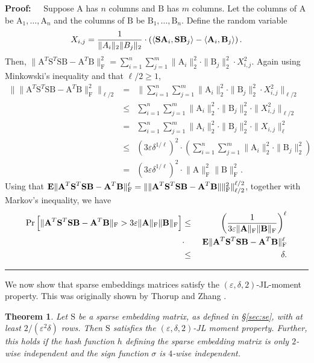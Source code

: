 \documentclass[11pt]{article}
\newcommand{\FNorm }[1]{\mbox{}\|#1\|_\mathrm{F}  }
\newcommand{\FNormS}[1]{\mbox{}\|#1\|_\mathrm{F}^2}
\newtheorem{theorem}{Theorem}
\newenvironment{proof}{\begin{trivlist} \item {\bf Proof:~~}}
  {\qed\end{trivlist}}
\newcommand{\mat}[1]{{\ensuremath{\bm{\mathrm{#1}}}}}
\def\matA{\mat{A}}
\def\matB{\mat{B}}
\def\matS{\mat{S}}
\def\frac#1#2{{#1\over #2}}
\def\qed{\hfill\rule{2mm}{2mm}}
\newcommand{\eps}{\varepsilon}
\begin{document}
\begin{proof}
Suppose $\matA$ has $n$ columns and $\matB$ has $m$ columns. 
Let the columns of $\matA$ be $\matA_1, \ldots, \matA_n$ and the columns of $\matB$ be $\matB_1, \ldots, \matB_n$. 
Define the random variable 
$$X_{i,j} = \frac{1}{\|A_i\|_2 \|B_j\|_2} \cdot \left (\langle \matS \matA_i, \matS \matB_j \rangle
- \langle \matA_i, \matB_j \rangle \right ).$$
Then, $\FNormS{\matA^T \matS^T \matS \matB - \matA^T \matB} = \sum_{i=1}^n \sum_{j=1}^m \|\matA_i\|_2^2 \cdot \|\matB_j\|_2^2 \cdot X_{i,j}^2$. Again using Minkowski's inequality and that $\ell/2 \geq 1$,
\begin{eqnarray*}
\|\FNormS{\matA^T\matS^T \matS \matB - \matA^T\matB}\|_{\ell/2} & = & 
\|\sum_{i=1}^n \sum_{j=1}^m \|\matA_i\|_2^2 \cdot \|\matB_j\|_2^2 \cdot X_{i,j}^2\|_{\ell/2}\\
& \leq & \sum_{i=1}^n \sum_{j=1}^m \|\matA_i\|_2^2 \cdot \|\matB_j\|_2^2 \cdot \|X_{i,j}^2\|_{\ell/2}\\
& = & \sum_{i=1}^n \sum_{j=1}^m \|\matA_i\|_2^2 \cdot \|\matB_j\|_2^2 \cdot \|X_{i,j}\|_{\ell}^2\\
& \leq & (3\eps \delta^{1/\ell})^2 \cdot \left (\sum_{i=1}^n \sum_{j=1}^m \|\matA_i\|_2^2 \cdot \|\matB_j\|_2^2 \right )\\
& = & (3\eps \delta^{1/\ell})^2 \cdot \FNormS{\matA} \FNormS{\matB}.
\end{eqnarray*}
Using that ${\bf E} \FNorm{\matA^T \matS^T \matS \matB - \matA^T \matB}^{\ell} = \|\FNormS{\matA^T\matS^T \matS \matB - \matA^T \matB\|} \|_{\ell/2}^{\ell/2}$, together with Markov's inequality, we have
\begin{eqnarray*}
\Pr \left [\FNorm{\matA^T\matS^T\matS\matB - \matA^T \matB} > 3\eps \FNorm{\matA} \FNorm{\matB} \right ]
& \leq & \left (\frac{1}{3\eps \FNorm{\matA} \FNorm{\matB}} \right )^{\ell}\\
& \cdot & \ {\bf E} \FNorm{\matA^T\matS^T\matS\matB - \matA^T \matB}^{\ell}\\
& \leq & \delta.
\end{eqnarray*}
\end{proof}
We now show that sparse embeddings matrices satisfy the $(\eps, \delta, 2)$-JL-moment property. This was originally shown
by Thorup and Zhang \cite{tz12}.
\begin{theorem}\label{thm:tz}
Let $\matS$ be a sparse embedding matrix, as defined in \S\ref{sec:se}, with at least $2/(\eps^2 \delta)$ rows. Then 
$\matS$ satisfies the $(\eps, \delta, 2)$-JL moment property. Further, this holds if the hash function $h$ defining the 
sparse embedding matrix is only $2$-wise independent and the sign function $\sigma$ is $4$-wise independent. 
\end{theorem}
\end{document}

